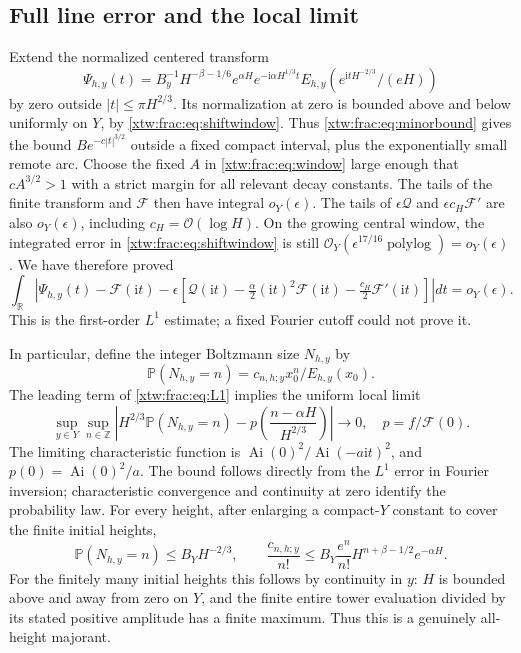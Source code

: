 \documentclass[11pt]{article}
\theoremstyle{remark}\newtheorem{remark}[theorem]{Remark}
\newcommand{\OO}{\mathcal O}
\newcommand{\R}{\mathbb R}
\newcommand{\Z}{\mathbb Z}
\newcommand{\Ai}{\operatorname{Ai}}
\newcommand{\Prb}{\mathbb P}
\newcommand{\ii}{\mathrm i}
\newcommand{\FF}{\mathcal F}
\newcommand{\QQ}{\mathcal Q}
\begin{document}
\subsection{Full line error and the local limit}
Extend the normalized centered transform
\[
 \Psi_{h,y}(t)=B_y^{-1}H^{-\beta-1/6}e^{\alpha H}
 e^{-\ii\alpha H^{1/3}t}E_{h,y}(e^{\ii tH^{-2/3}}/(eH))
\]
by zero outside $|t|\le\pi H^{2/3}$.
Its normalization at zero is bounded above and below uniformly on $Y$,
by \eqref{xtw:frac:eq:shiftwindow}. Thus \eqref{xtw:frac:eq:minorbound} gives the bound
$Be^{-c|t|^{3/2}}$ outside a fixed compact interval, plus the exponentially
small remote arc. Choose the fixed $A$ in \eqref{xtw:frac:eq:window} large enough
that $cA^{3/2}>1$ with a strict margin for all relevant decay constants.
The tails of the finite transform and $\FF$ then have integral
$o_Y(\epsilon)$. The tails of $\epsilon\QQ$ and
$\epsilon c_H\FF'$ are also $o_Y(\epsilon)$, including
$c_H=\OO(\log H)$.
On the growing central window, the integrated error in
\eqref{xtw:frac:eq:shiftwindow} is still
$\OO_Y(\epsilon^{17/16}\operatorname{polylog})=o_Y(\epsilon)$.
We have therefore proved
\begin{equation}\label{xtw:frac:eq:L1}
 \int_\R\left|\Psi_{h,y}(t)-\FF(\ii t)
 -\epsilon\left[\QQ(\ii t)-\tfrac\alpha2(\ii t)^2\FF(\ii t)
                              -\tfrac{c_H}2\FF'(\ii t)\right]\right|dt
 =o_Y(\epsilon).
\end{equation}
This is the first-order $L^1$ estimate; a fixed Fourier cutoff could not
prove it.

In particular, define the integer Boltzmann size $N_{h,y}$ by
\[
 \Prb(N_{h,y}=n)=c_{n,h;y}x_0^n/E_{h,y}(x_0).
\]
The leading term of \eqref{xtw:frac:eq:L1} implies the uniform local limit
\begin{equation}\label{xtw:frac:eq:llt}
 \sup_{y\in Y}\sup_{n\in\Z}
 \left|H^{2/3}\Prb(N_{h,y}=n)
       -p\left(\frac{n-\alpha H}{H^{2/3}}\right)\right|\longrightarrow0,
 \quad p=f/\FF(0).
\end{equation}
The limiting characteristic function is
$\Ai(0)^2/\Ai(-a\ii t)^2$, and $p(0)=\Ai(0)^2/a$.
The bound follows directly from the $L^1$ error in Fourier inversion;
characteristic convergence and continuity at zero identify the probability
law. For every height, after enlarging a compact-$Y$ constant to cover the
finite initial heights,
\begin{equation}\label{xtw:frac:eq:probmajorant}
 \Prb(N_{h,y}=n)\le B_YH^{-2/3},\qquad
 \frac{c_{n,h;y}}{n!}\le
 B_Y\frac{e^n}{n!}H^{n+\beta-1/2}e^{-\alpha H}.
\end{equation}
For the finitely many initial heights this follows by continuity in $y$:
$H$ is bounded above and away from zero on $Y$, and the finite entire
tower evaluation divided by its stated positive amplitude has a finite
maximum. Thus this is a genuinely all-height majorant.
\end{document}
